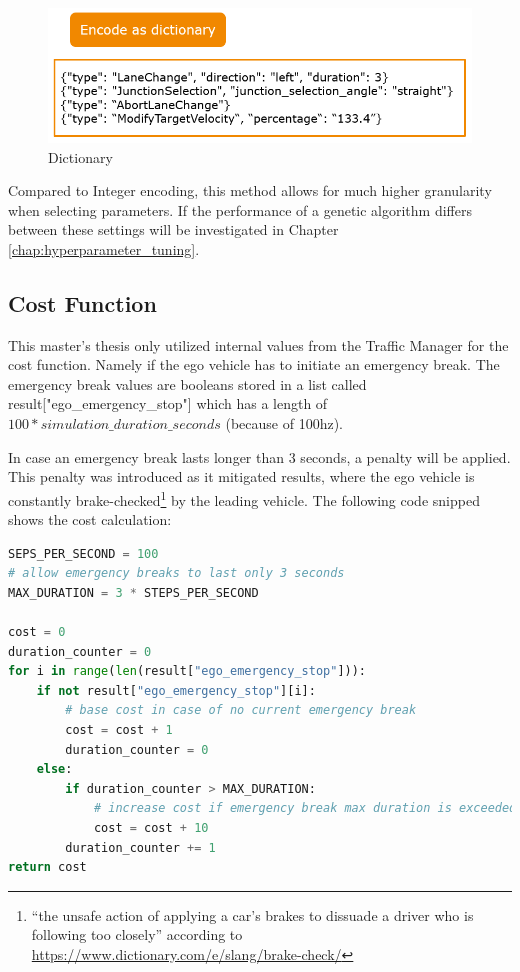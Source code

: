 \begin{figure}[ht] 
	\includegraphics[width=1\linewidth]{figures/dict_encoding}
	\caption{Dictionary}
	\label{figure:encoding:gene:dict}
\end{figure}

Compared to Integer encoding, this method allows for much higher granularity when selecting parameters. If the performance of a genetic algorithm differs between these settings will be investigated in Chapter \ref{chap:hyperparameter_tuning}.

\subsection{Cost Function}
\label{implementation:cost_function}
This master's thesis only utilized internal values from the Traffic Manager for the cost function. Namely if the ego vehicle has to initiate an emergency break. The emergency break values are booleans stored in a list called result["ego\_emergency\_stop"] which has a length of $100 * simulation\_duration\_seconds$ (because of 100hz). 

In case an emergency break lasts longer than 3 seconds, a penalty will be applied. This penalty was introduced as it mitigated results, where the ego vehicle is constantly brake-checked\footnote{\enquote{the unsafe action of applying a car’s brakes to dissuade a driver who is following too closely} according to \href{https://www.dictionary.com/e/slang/brake-check/}{https://www.dictionary.com/e/slang/brake-check/}} by the leading vehicle. The following code snipped shows the cost calculation:
\begin{lstlisting}[language=Python, tabsize=4]
SEPS_PER_SECOND = 100
# allow emergency breaks to last only 3 seconds
MAX_DURATION = 3 * STEPS_PER_SECOND

cost = 0
duration_counter = 0
for i in range(len(result["ego_emergency_stop"])):
	if not result["ego_emergency_stop"][i]:
		# base cost in case of no current emergency break
		cost = cost + 1
		duration_counter = 0
	else:
		if duration_counter > MAX_DURATION:
			# increase cost if emergency break max duration is exceeded
			cost = cost + 10
		duration_counter += 1
return cost
\end{lstlisting}

